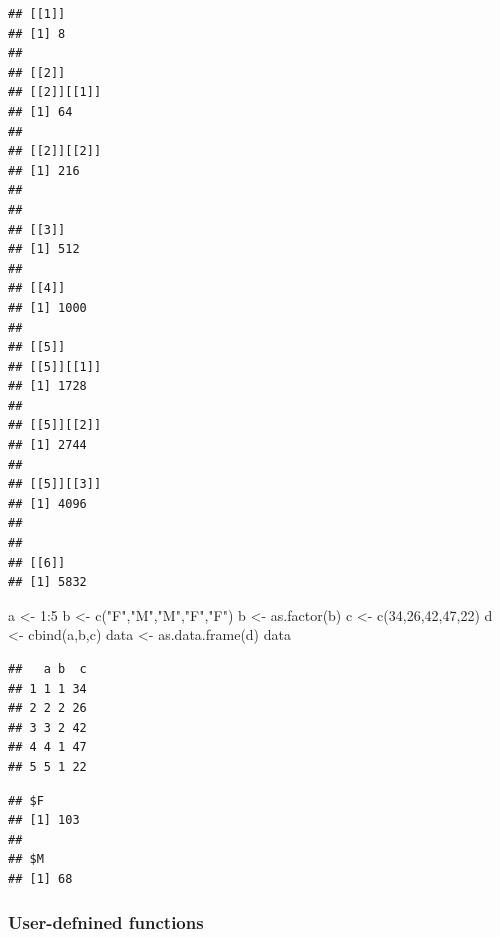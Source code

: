 \documentclass[]{article}
\newenvironment{Shaded}{\begin{snugshade}}{\end{snugshade}}
\newcommand{\AttributeTok}[1]{\textcolor[rgb]{0.77,0.63,0.00}{#1}}
\newcommand{\ConstantTok}[1]{\textcolor[rgb]{0.00,0.00,0.00}{#1}}
\newcommand{\DecValTok}[1]{\textcolor[rgb]{0.00,0.00,0.81}{#1}}
\newcommand{\FunctionTok}[1]{\textcolor[rgb]{0.00,0.00,0.00}{#1}}
\newcommand{\NormalTok}[1]{#1}
\newcommand{\OtherTok}[1]{\textcolor[rgb]{0.56,0.35,0.01}{#1}}
\newcommand{\SpecialCharTok}[1]{\textcolor[rgb]{0.00,0.00,0.00}{#1}}
\newcommand{\StringTok}[1]{\textcolor[rgb]{0.31,0.60,0.02}{#1}}
\begin{document}
\begin{verbatim}
## [[1]]
## [1] 8
## 
## [[2]]
## [[2]][[1]]
## [1] 64
## 
## [[2]][[2]]
## [1] 216
## 
## 
## [[3]]
## [1] 512
## 
## [[4]]
## [1] 1000
## 
## [[5]]
## [[5]][[1]]
## [1] 1728
## 
## [[5]][[2]]
## [1] 2744
## 
## [[5]][[3]]
## [1] 4096
## 
## 
## [[6]]
## [1] 5832
\end{verbatim}

\begin{Shaded}
\begin{Highlighting}[]
\NormalTok{a }\OtherTok{\textless{}{-}} \DecValTok{1}\SpecialCharTok{:}\DecValTok{5}
\NormalTok{b }\OtherTok{\textless{}{-}} \FunctionTok{c}\NormalTok{(}\StringTok{"F"}\NormalTok{,}\StringTok{"M"}\NormalTok{,}\StringTok{"M"}\NormalTok{,}\StringTok{"F"}\NormalTok{,}\StringTok{"F"}\NormalTok{)}
\NormalTok{b }\OtherTok{\textless{}{-}} \FunctionTok{as.factor}\NormalTok{(b)}
\NormalTok{c }\OtherTok{\textless{}{-}} \FunctionTok{c}\NormalTok{(}\DecValTok{34}\NormalTok{,}\DecValTok{26}\NormalTok{,}\DecValTok{42}\NormalTok{,}\DecValTok{47}\NormalTok{,}\DecValTok{22}\NormalTok{)}
\NormalTok{d }\OtherTok{\textless{}{-}} \FunctionTok{cbind}\NormalTok{(a,b,c)}
\NormalTok{data }\OtherTok{\textless{}{-}} \FunctionTok{as.data.frame}\NormalTok{(d)}
\NormalTok{data}
\end{Highlighting}
\end{Shaded}

\begin{verbatim}
##   a b  c
## 1 1 1 34
## 2 2 2 26
## 3 3 2 42
## 4 4 1 47
## 5 5 1 22
\end{verbatim}

\begin{Shaded}
\end{Shaded}

\begin{verbatim}
## $F
## [1] 103
## 
## $M
## [1] 68
\end{verbatim}

\hypertarget{user-defnined-functions}{%
\subsubsection{User-defnined functions}\label{user-defnined-functions}}
\end{document}
